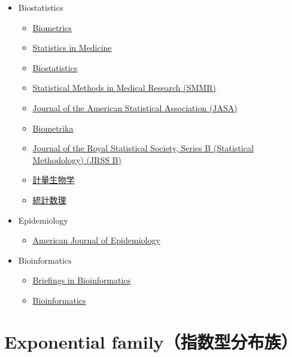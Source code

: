 \documentclass[
]{book}
\providecommand{\tightlist}{%
  \setlength{\itemsep}{0pt}\setlength{\parskip}{0pt}}
\begin{document}
\begin{itemize}
\item
  Biostatistics

  \begin{itemize}
  \tightlist
  \item
    \href{https://academic.oup.com/biometrics}{Biometrics}
  \item
    \href{https://onlinelibrary.wiley.com/journal/10970258}{Statistics in Medicine}
  \item
    \href{https://academic.oup.com/biostatistics}{Biostatistics}
  \item
    \href{https://journals.sagepub.com/home/SMM}{Statistical Methods in Medical Research (SMMR)}
  \item
    \href{https://www.tandfonline.com/journals/uasa20}{Journal of the American Statistical Association (JASA)}
  \item
    \href{https://academic.oup.com/biomet}{Biometrika}
  \item
    \href{https://academic.oup.com/jrsssb?login=true}{Journal of the Royal Statistical Society, Series B (Statistical Methodology) (JRSS B)}
  \item
    \href{https://www.jstage.jst.go.jp/browse/jjb/-char/ja}{計量生物学}
  \item
    \href{https://www.ism.ac.jp/editsec/toukei/index.html}{統計数理}
  \end{itemize}
\item
  Epidemiology

  \begin{itemize}
  \tightlist
  \item
    \href{https://academic.oup.com/aje}{American Journal of Epidemiology}
  \end{itemize}
\item
  Bioinformatics

  \begin{itemize}
  \tightlist
  \item
    \href{https://academic.oup.com/bib}{Briefings in Bioinformatics}
  \item
    \href{https://academic.oup.com/bioinformatics}{Bioinformatics}
  \end{itemize}
\end{itemize}

\chapter{Exponential family（指数型分布族）}\label{exponential-familyux6307ux6570ux578bux5206ux5e03ux65cf}
\end{document}
